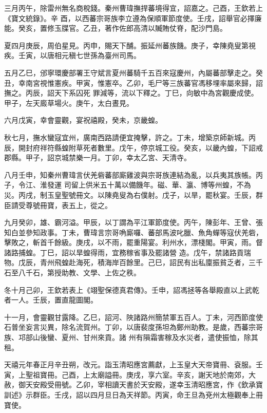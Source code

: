 \begin{pinyinscope}
 三月丙午，除雷州無名商稅錢。秦州曹瑋撫捍蕃境得宜，詔嘉之。己酉，王欽若上《寶文統錄》。辛
 酉，以西蕃宗哥族李立遵為保順軍節度使。壬戌，詔舉官必擇廉能。癸亥，置修玉牒官。乙丑，著作佐郎高清以贓賄仗脊，配沙門島。



 夏四月庚辰，周伯星見。丙申，賜天下酺。振延州蕃族饑。庚子，幸陳堯叟第視疾。壬寅，以唐相元稹七世孫為臺州司馬。



 五月乙巳，邠寧環慶部署王守斌言夏州蕃騎千五百來寇慶州，內屬蕃部擊走之。癸丑，幸南宮視惟憲疾。甲寅，惟憲卒。乙卯，毛尸等三族蕃官馮移埋率屬來歸，詔撫之。丙辰，詔天下系囚死
 罪減等，流以下釋之。丁巳，向敏中為宮觀慶成使。甲子，左天廄草場火。庚午，太白晝見。



 六月戊寅，幸會靈觀，宴祝禧殿，癸未，京畿蝗。



 秋七月，撫水蠻寇宜州，廣南西路請便宜掩擊，許之。丁未，增築京師新城。丙辰，開封府祥符縣蝗附草死者數里。戊午，停京城工役。癸亥，以畿內蝗，下詔戒郡縣。甲子，詔京城禁樂一月。丁卯，幸太乙宮、天清寺。



 八月壬申，知秦州曹瑋言伏羌砦蕃部廝雞波與宗哥族連結為亂，以兵夷其族帳。丙子，令江、淮發運
 司留上供米五十萬以備饑年。磁、華、瀛、博等州蝗，不為災。丙戌，制玉皇聖號冊文。以陳堯叟為右僕射。戊子，以旱，罷秋宴。壬辰，群臣請受尊號冊寶，表五上，從之。



 九月癸卯，雄、霸河溢。甲辰，以丁謂為平江軍節度使。丙午，陳彭年、王曾、張知白並參知政事。丁未，曹瑋言宗哥唃廝囉、蕃部馬波叱臘、魚角蟬等寇伏羌砦，擊敗之，斬首千餘級。庚戌，以不雨，罷重陽宴。利州水，漂棧閣。甲寅，雨。督諸路捕蝗。丁巳，詔以旱蝗得雨，宜務稼省事及罷諸營
 造。戊午，禁諸路貢瑞物。戊辰，青州飛蝗赴海死，積海岸百餘里。己巳，詔民有出私廩振貧乏者，三千石至八千石，第授助教、文學、上佐之秩。



 冬十月己卯，王欽若表上《翊聖保德真君傳》。壬申，詔馮拯等各舉殿直以上武乾者一人。壬辰，置直龍圖閣。



 十一月，會靈觀甘露降。乙巳，詔河、陜諸路州簡禁軍五百人。丁未，河西節度使石普坐妄言災異，除名流賀州。丁卯，以唐裴度孫坦為鄭州助教。是歲，西蕃宗哥族、邛部山後蠻、夏州、甘州來貢。諸
 州有隕霜害稼及水災者，遣使振恤，除其租。



 天禧元年春正月辛丑朔，改元。詣玉清昭應宮薦獻，上玉皇大天帝寶冊、袞服。壬寅，上聖祖寶冊。己酉，上太廟謚冊。庚戌，享六室。辛亥，謝天地於南郊，大赦，御天安殿受冊號。乙卯，宰相讀天書於天安殿，遂幸玉清昭應宮，作《欽承寶訓述》示群臣。壬戌，詔以四月旦日為天祥節。丙寅，命王旦為兗州太極觀奉上冊寶使。




\end{pinyinscope}
